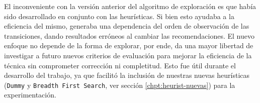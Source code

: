 El inconveniente con la versión anterior del algoritmo de exploración es que había sido desarrollado en conjunto con las heurísticas. Si bien esto ayudaba a la eficiencia del mismo, generaba una dependencia del orden de observación de las transiciones, dando resultados erróneos al cambiar las recomendaciones. El nuevo enfoque no depende de la forma de explorar, por ende, da una mayor libertad de investigar a futuro nuevos criterios de evaluación para mejorar la eficiencia de la técnica sin comprometer corrección ni completitud. Esto fue útil durante el desarrollo del trabajo, ya que facilitó la inclusión de nuestras nuevas heurísticas (\texttt{Dummy} y \texttt{Breadth First Search}, ver sección \ref{chpt:heurist-nuevas}) para la experimentación.
